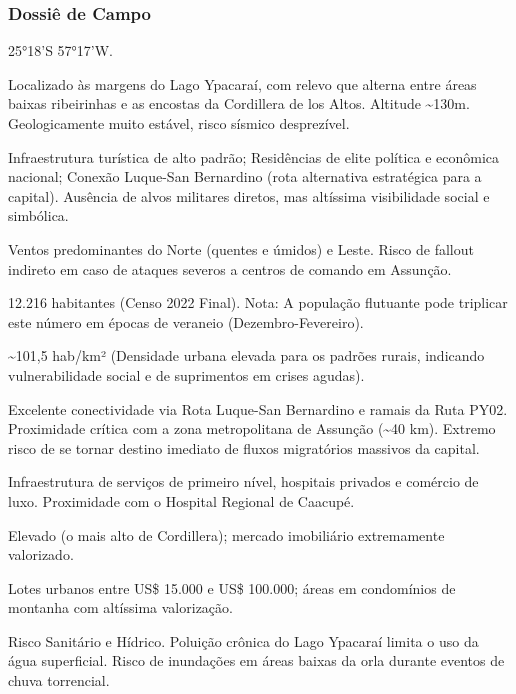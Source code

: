 \subsubsection{Dossiê de Campo}
\begin{description}[style=nextline,leftmargin=0.5cm,font=\bfseries]
\item[Coordenadas]  25°18'S 57°17'W.
\item[Topografia]  Localizado às margens do Lago Ypacaraí, com relevo que alterna entre áreas baixas ribeirinhas e as encostas da Cordillera de los Altos. Altitude \textasciitilde 130m. Geologicamente muito estável, risco sísmico desprezível.
\item[Alvos Estratégicos]  Infraestrutura turística de alto padrão; Residências de elite política e econômica nacional; Conexão Luque-San Bernardino (rota alternativa estratégica para a capital). Ausência de alvos militares diretos, mas altíssima visibilidade social e simbólica.
\item[Fallout]  Ventos predominantes do Norte (quentes e úmidos) e Leste. Risco de fallout indireto em caso de ataques severos a centros de comando em Assunção.
\item[População]  12.216 habitantes (Censo 2022 Final). Nota: A população flutuante pode triplicar este número em épocas de veraneio (Dezembro-Fevereiro).
\item[Densidade]  \textasciitilde 101,5 hab/\allowbreak km² (Densidade urbana elevada para os padrões rurais, indicando vulnerabilidade social e de suprimentos em crises agudas).
\item[Vias de Acesso]  Excelente conectividade via Rota Luque-San Bernardino e ramais da Ruta PY02. Proximidade crítica com a zona metropolitana de Assunção (\textasciitilde 40 km). Extremo risco de se tornar destino imediato de fluxos migratórios massivos da capital.
\item[Serviços]  Infraestrutura de serviços de primeiro nível, hospitais privados e comércio de luxo. Proximidade com o Hospital Regional de Caacupé.
\item[Custo de Vida]  Elevado (o mais alto de Cordillera); mercado imobiliário extremamente valorizado.
\item[Preço da Terra]  Lotes urbanos entre US\$ 15.000 e US\$ 100.000; áreas em condomínios de montanha com altíssima valorização.
\item[Hidrologia]  Risco Sanitário e Hídrico. Poluição crônica do Lago Ypacaraí limita o uso da água superficial. Risco de inundações em áreas baixas da orla durante eventos de chuva torrencial.

\end{description}
